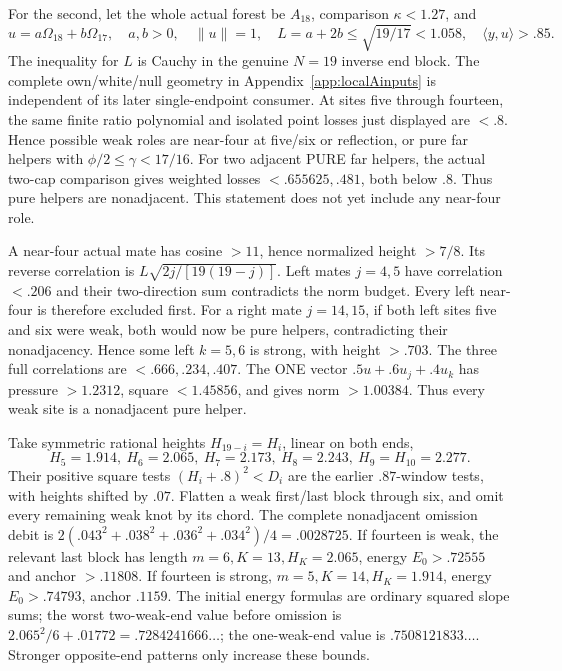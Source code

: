 \documentclass[11pt]{article}
\theoremstyle{definition}
\theoremstyle{remark}
\newcommand{\ip}[2]{\langle #1,#2\rangle}
\newcommand{\norm}[1]{\lVert #1\rVert}
\begin{document}
For the second, let the whole actual forest be \(A_{18}\), comparison
\(\kappa<1.27\), and
\[
 u=a\Omega_{18}+b\Omega_{17},\quad a,b>0,\quad
 \norm u=1,\quad L=a+2b\leq\sqrt{19/17}<1.058,\quad
 \ip yu>.85 .
\]
The inequality for \(L\) is Cauchy in the genuine \(N=19\)
inverse end block.
The complete own/white/null geometry in
Appendix~\ref{app:localAinputs} is independent of its later
single-endpoint consumer.
At sites five through fourteen, the same finite ratio polynomial
and isolated point losses just displayed are \(<.8\).
Hence possible weak roles are near-four at five/six or reflection,
or pure far helpers with \(\phi/2\leq\gamma<17/16\).
For two adjacent PURE far helpers, the actual two-cap comparison
gives weighted losses \(<.655625,\allowbreak .481\), both below \(.8\).
Thus pure helpers are nonadjacent. This statement does not yet
include any near-four role.

A near-four actual mate has cosine \(>11\), hence normalized
height \(>7/8\). Its reverse correlation is
\(L\sqrt{2j/[19(19-j)]}\).
Left mates \(j=4,5\) have correlation \(<.206\) and their
two-direction sum contradicts the norm budget.
Every left near-four is therefore excluded first.
For a right mate \(j=14,15\), if both left sites five and six
were weak, both would now be pure helpers, contradicting their
nonadjacency. Hence some left \(k=5,6\) is strong, with height \(>.703\).
The three full correlations are \(<.666,.234,.407\).
The ONE vector \(.5u+.6u_j+.4u_k\) has pressure \(>1.2312\),
square \(<1.45856\), and gives norm \(>1.00384\).
Thus every weak site is a nonadjacent pure helper.

Take symmetric rational heights \(H_{19-i}=H_i\), linear on both ends,
\[
 H_5=1.914,\ H_6=2.065,\ H_7=2.173,\ H_8=2.243,\
 H_9=H_{10}=2.277 .
\]
Their positive square tests \((H_i+.8)^2<D_i\) are the
earlier \(.87\)-window tests, with heights shifted by \(.07\).
Flatten a weak first/last block through six, and omit every remaining
weak knot by its chord.
The complete nonadjacent omission debit is
\(2(.043^2+.038^2+.036^2+.034^2)/4=.0028725\).
If fourteen is weak, the relevant last block has length
\(m=6,K=13,H_K=2.065\), energy \(E_0>.72555\) and
anchor \(>.11808\).
If fourteen is strong, \(m=5,K=14,H_K=1.914\),
energy \(E_0>.74793\), anchor \(.1159\).
The initial energy formulas are ordinary squared slope sums;
the worst two-weak-end value before omission is
\(2.065^2/6+.01772=.7284241666\ldots\);
the one-weak-end value is \(.7508121833\ldots\).
Stronger opposite-end patterns only increase these bounds.
\end{document}
